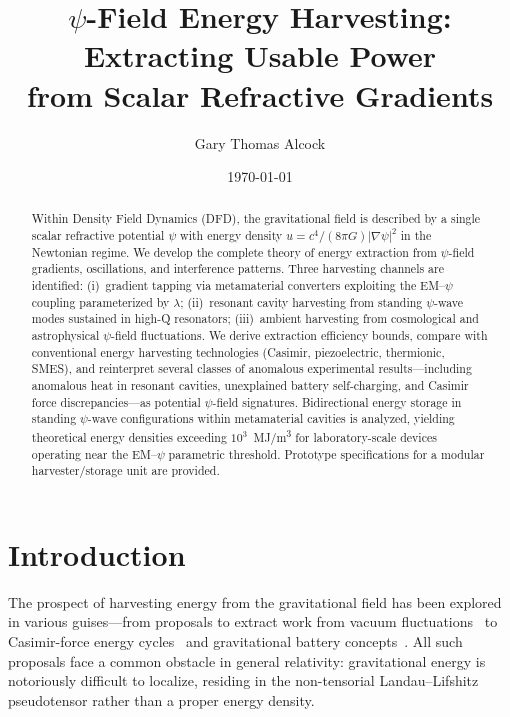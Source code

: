 \documentclass[aps,prd,twocolumn,showpacs,preprintnumbers,superscriptaddress,nofootinbib]{revtex4-2}
\begin{document}
\title{$\psi$-Field Energy Harvesting: Extracting Usable Power \\
from Scalar Refractive Gradients}

\author{Gary Thomas Alcock}

\date{\today}

\begin{abstract}
Within Density Field Dynamics (DFD), the gravitational field is described by
a single scalar refractive potential $\psi$ with energy density
$u = c^4/(8\pi G)|\nabla\psi|^2$ in the Newtonian regime.  We develop the
complete theory of energy extraction from $\psi$-field gradients,
oscillations, and interference patterns.  Three harvesting channels are
identified: (i)~gradient tapping via metamaterial converters exploiting
the EM--$\psi$ coupling parameterized by $\lambda$; (ii)~resonant cavity
harvesting from standing $\psi$-wave modes sustained in high-Q resonators;
(iii)~ambient harvesting from cosmological and astrophysical $\psi$-field
fluctuations.  We derive extraction efficiency bounds, compare with
conventional energy harvesting technologies (Casimir, piezoelectric,
thermionic, SMES), and reinterpret several classes of anomalous
experimental results---including anomalous heat in resonant cavities,
unexplained battery self-charging, and Casimir force
discrepancies---as potential $\psi$-field signatures.  Bidirectional
energy storage in standing $\psi$-wave configurations within metamaterial
cavities is analyzed, yielding theoretical energy densities exceeding
$10^3$~\si{MJ/m^3} for laboratory-scale devices operating near the
EM--$\psi$ parametric threshold.  Prototype specifications for a
modular harvester/storage unit are provided.
\end{abstract}

\maketitle
\tableofcontents

\section{Introduction}\label{sec:intro}

The prospect of harvesting energy from the gravitational field has been
explored in various guises---from proposals to extract work from vacuum
fluctuations~\cite{Forward1984,Cole1993} to Casimir-force energy
cycles~\cite{Lambrecht2002} and gravitational battery
concepts~\cite{Gravitricity2020}.  All such proposals face a common
obstacle in general relativity: gravitational energy is notoriously
difficult to localize, residing in the non-tensorial Landau--Lifshitz
pseudotensor rather than a proper energy density.
\end{document}
